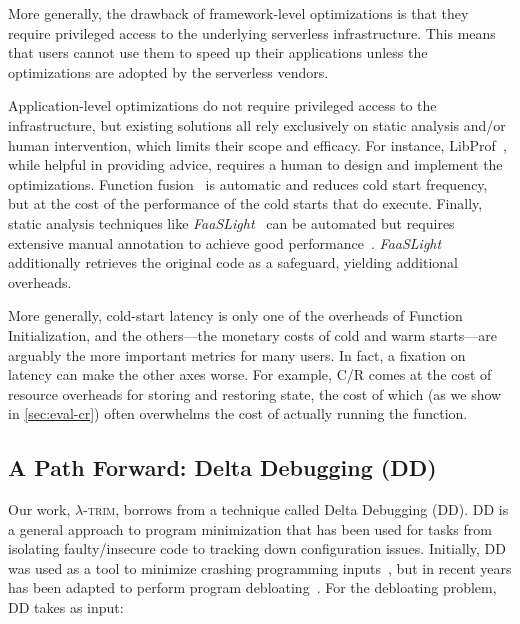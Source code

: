 \documentclass[sigplan,screen]{acmart}
\newcommand{\sys}{\textsc{\ensuremath{\lambda}-trim}\xspace}
\newcounter{example}
\begin{document}
More generally, the drawback of framework-level optimizations is that they require privileged access to the underlying serverless infrastructure.
This means that users cannot use them to speed up their applications unless the optimizations are adopted by the serverless vendors.





Application-level optimizations do not require privileged access to the infrastructure, but existing solutions all rely exclusively on static analysis and/or human intervention, which limits their scope and efficacy.
For instance, LibProf~\cite{libprof2024}, while helpful in providing advice, requires a human to design and implement the optimizations.
Function fusion~\cite{fusion2023, fusion2024} is automatic and reduces cold start frequency, but at the cost of the performance of the cold starts that do execute.
Finally, static analysis techniques like \textit{FaaSLight}~\cite{faaslight2023} can be automated but requires extensive manual annotation to achieve good performance~\cite{faaslight2023github}.
\textit{FaaSLight} additionally retrieves the original code as a safeguard, yielding additional overheads.




More generally, cold-start latency is only one of the overheads of Function Initialization, and the others---the monetary costs of cold and warm starts---are arguably the more important metrics for many users.
In fact, a fixation on latency can make the other axes worse.
For example, C/R comes at the cost of resource overheads for storing and restoring state, the cost of which (as we show in \cref{sec:eval-cr}) often overwhelms the cost of actually running the function.









 
\subsection{A Path Forward: Delta Debugging (DD)}

Our work, \sys, borrows from a technique called Delta Debugging (DD).
DD is a general approach to program minimization that has been used for tasks from isolating faulty/insecure code to tracking down configuration issues.
Initially, DD was used as a tool to minimize crashing programming inputs~\cite{debloat1999, delta2002}, but in recent years has been adapted to perform program debloating~\cite{deltarl2018}.
For the debloating problem, DD takes as input:
\end{document}
